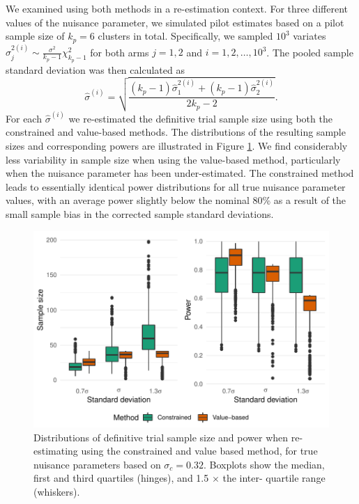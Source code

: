 \documentclass[sagev, Crown]{sagej}
\begin{document}
We examined using both methods in a re-estimation context. For three different values of the nuisance parameter, we simulated pilot estimates based on a pilot sample size of $k_p = 6$ clusters in total. Specifically, we sampled $10^3$ variates $\hat{\sigma}_j^{2 (i)} \sim \frac{\sigma^2}{k_p-1} \chi^2_{k_p-1}$ for both arms $j=1,2$ and $i = 1, 2, \ldots , 10^3$. The pooled sample standard deviation was then calculated as 
$$
\hat{\sigma}^{(i)} = \sqrt{\frac{(k_p - 1)\hat{\sigma}_1^{2 (i)} + (k_p - 1)\hat{\sigma}_2^{2 (i)}}{2k_p - 2}}.
$$
For each $\hat{\sigma}^{(i)}$ we re-estimated the definitive trial sample size using both the constrained and value-based methods. The distributions of the resulting sample sizes and corresponding powers are illustrated in Figure \ref{fig:dists_t_test}. We find considerably less variability in sample size when using the value-based method, particularly when the nuisance parameter has been under-estimated. The constrained method leads to essentially identical power distributions for all true nuisance parameter values, with an average power slightly below the nominal 80\% as a result of the small sample bias in the corrected sample standard deviations.


\begin{figure}
\centering
\includegraphics[scale=0.8]{./figures/dists_t_test}
\caption{Distributions of definitive trial sample size and power when re-estimating using the constrained and value based method, for true nuisance parameters based on $\sigma_c = 0.32$.  Boxplots show the median, first and third quartiles (hinges), and 1.5 $\times$ the inter- quartile range (whiskers).}
\label{fig:dists_t_test}
\end{figure}
\end{document}
